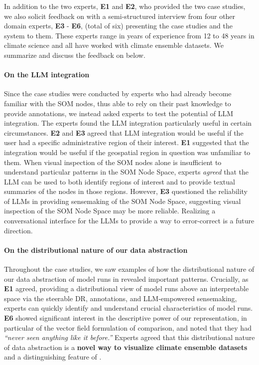 In addition to the two experts, \textbf{E1} and \textbf{E2}, who provided the two case studies, we also solicit feedback on \ClimateSOM with a semi-structured interview from four other domain experts, \textbf{E3} - \textbf{E6}, (total of six) presenting the case studies and the system to them.
%
These experts range in years of experience from 12 to 48 years in climate science and all have worked with climate ensemble datasets.
%
We summarize and discuss the feedback on \ClimateSOM below.

\paragraph{On the LLM integration} Since the case studies were conducted by experts who had already become familiar with the SOM nodes, thus able to rely on their past knowledge to provide annotations, we instead asked experts to test the potential of LLM integration.
%
The experts found the LLM integration particularly useful in certain circumstances. 
%
\textbf{E2} and \textbf{E3} agreed that LLM integration would be useful if the user had a specific administrative region of their interest.
%
\textbf{E1} suggested that the integration would be useful if the geospatial region in question was unfamiliar to them.
%
When visual inspection of the SOM nodes alone is insufficient to understand particular patterns in the SOM Node Space, experts \textit{agreed} that the LLM can be used to both identify regions of interest and to provide textual summaries of the nodes in those regions.
%
However, \textbf{E3} questioned the reliability of LLMs in providing sensemaking of the SOM Node Space, suggesting visual inspection of the SOM Node Space may be more reliable.
% 
Realizing a conversational interface for the LLMs to provide a way to error-correct is a future direction.

\paragraph{On the distributional nature of our data abstraction}
Throughout the case studies, we saw examples of how the distributional nature of our data abstraction of model runs in \ClimateSOM revealed important patterns.
%
Crucially, as \textbf{E1} agreed, providing a distributional view of model runs above an interpretable space via the steerable DR, annotations, and LLM-empowered sensemaking, experts can quickly identify and understand crucial characteristics of model runs.
%
%
\textbf{E6} showed significant interest in the descriptive power of our representation, in particular of the vector field formulation of comparison, and noted that they had \textit{``never seen anything like it before.''}
%
Experts agreed that this distributional nature of data abstraction is a \textbf{novel way to visualize climate ensemble datasets} and a distinguishing feature of \ClimateSOM.

